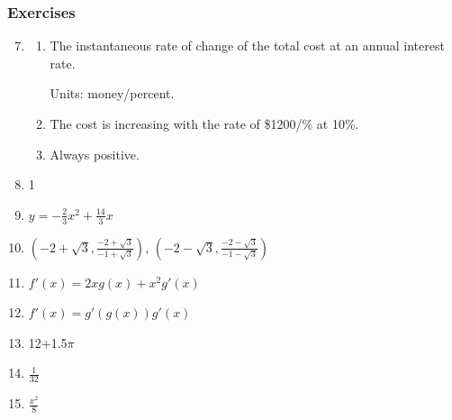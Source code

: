 \documentclass{article}
\begin{document}
\subsubsection*{Exercises}
\begin{enumerate}
    \setcounter{enumi}{6}
  \item
    \begin{enumerate}
      \item The instantaneous rate of change of the total cost at an annual interest rate.

        Units: money/percent.
      \item The cost is increasing with the rate of \$1200/\% at 10\%.
      \item Always positive.
    \end{enumerate}
    \setcounter{enumi}{44}
  \item 1
    \setcounter{enumi}{54}
  \item $y=-\frac{2}{3}x^2+\frac{14}{3}x$
  \item $\left(-2+\sqrt{3}, \frac{-2+\sqrt{3}}{-1+\sqrt{3}}\right)$,
    $\left(-2-\sqrt{3}, \frac{-2-\sqrt{3}}{-1-\sqrt{3}}\right)$
    \setcounter{enumi}{60}
  \item $f'(x)=2xg(x)+x^2g'(x)$
    \setcounter{enumi}{64}
  \item $f'(x)=g'(g(x))g'(x)$
    \setcounter{enumi}{84}
  \item 12+1.5$\pi$
    \setcounter{enumi}{86}
  \item $\frac{1}{32}$
    \setcounter{enumi}{90}
  \item $\frac{x^2}{8}$
\end{enumerate}
\end{document}
